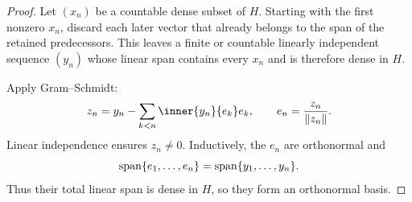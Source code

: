 \begin{proof}
Let $(x_n)$ be a countable dense subset of $H$.  Starting with the first
nonzero $x_n$, discard each later vector that already belongs to the span of
the retained predecessors.  This leaves a finite or countable linearly
independent sequence $(y_n)$ whose linear span contains every $x_n$ and is
therefore dense in $H$.

Apply Gram--Schmidt:
\[
  z_n=y_n-\sum_{k<n}\inner{y_n}{e_k}e_k,
  \qquad
  e_n=\frac{z_n}{\|z_n\|}.
\]
Linear independence ensures $z_n\ne0$.  Inductively, the $e_n$ are
orthonormal and
\[
  \operatorname{span}\{e_1,\ldots,e_n\}
  =\operatorname{span}\{y_1,\ldots,y_n\}.
\]
Thus their total linear span is dense in $H$, so they form an orthonormal
basis.
\end{proof}

